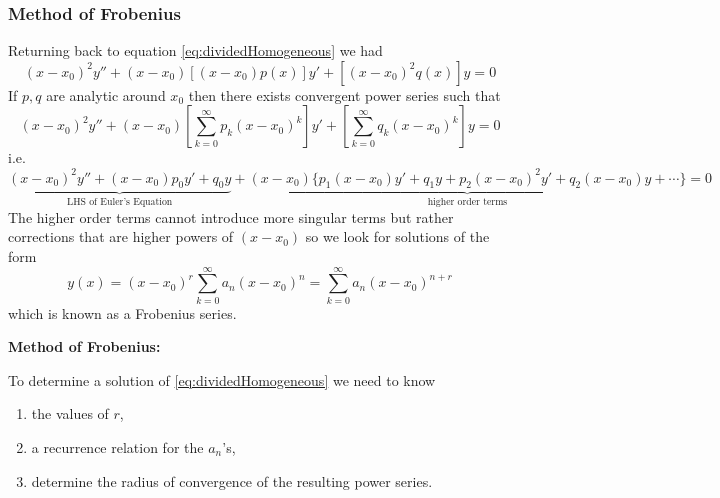 \documentclass{article}
\theoremstyle{plain}
\theoremstyle{definition}
\numberwithin{equation}{section}
\begin{document}
\subsubsection{Method of Frobenius}

Returning back to equation \eqref{eq:dividedHomogeneous} we had
\[
(x-x_0)^2y'' + (x-x_0)\left[ (x-x_0)p(x)\right]y' + \left[ (x-x_0)^2q(x)\right]y = 0
\]
If $p,q$ are analytic around $x_0$ then there exists convergent power series such that
\[
(x-x_0)^2y'' + (x-x_0)\left[\sum_{k=0}^{\infty}p_k(x-x_0)^k \right]y' + \left[ \sum_{k=0}^{\infty}q_k(x-x_0)^k\right]y = 0
\]
i.e.
\[
\underbrace{(x-x_0)^2y'' + (x-x_0)p_0y' + q_0y}_{\text{LHS of Euler's Equation}} + \underbrace{(x-x_0)\Big\{ p_1(x-x_0)y' + q_1y + p_2(x-x_0)^2y' + q_2(x-x_0)y + \cdots \Big\}}_{\text{higher order terms}} = 0
\]
The higher order terms cannot introduce more singular terms but rather corrections that are higher powers of $(x-x_0)$ so we look for solutions of the form
\[
y(x) = (x-x_0)^r\sum_{k=0}^{\infty} a_n(x-x_0)^n = \sum_{k=0}^{\infty} a_n(x-x_0)^{n+r}
\]
which is known as a Frobenius series.

\textbf{Method of Frobenius:}

To determine a solution of \eqref{eq:dividedHomogeneous} we need to know
\begin{enumerate}[1)]
    \item the values of $r$,
    \item a recurrence relation for the $a_n$'s,
    \item determine the radius of convergence of the resulting power series.
\end{enumerate}
\end{document}
